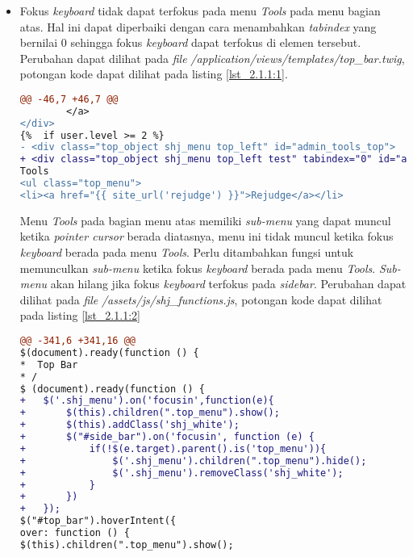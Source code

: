 \begin{itemize}
	\item Fokus \textit{keyboard} tidak dapat terfokus pada menu \textit{Tools} pada menu bagian atas. Hal ini dapat diperbaiki dengan cara menambahkan \textit{tabindex} yang bernilai 0 sehingga fokus \textit{keyboard} dapat terfokus di elemen tersebut. Perubahan dapat dilihat pada \textit{file} \textit{/application/views/templates/top\_bar.twig}, potongan kode dapat dilihat pada listing \ref{lst_2.1.1:1}.
	
\begin{lstlisting}[language=diff, caption=Perubahan pada \textit{file} \textit{top\_bar.twig}, label=lst_2.1.1:1, basicstyle=\ttfamily, frame=single,
columns=fullflexible, keepspaces=true, breaklines=true]
@@ -46,7 +46,7 @@
 		</a>
</div>
{%  if user.level >= 2 %}
- <div class="top_object shj_menu top_left" id="admin_tools_top">
+ <div class="top_object shj_menu top_left test" tabindex="0" id="admin_tools_top">
Tools
<ul class="top_menu">
<li><a href="{{ site_url('rejudge') }}">Rejudge</a></li>
\end{lstlisting}
	
	Menu \textit{Tools} pada bagian menu atas memiliki \textit{sub-menu} yang dapat muncul ketika \textit{pointer cursor} berada diatasnya, menu ini tidak muncul ketika fokus \textit{keyboard} berada pada menu \textit{Tools}. Perlu ditambahkan fungsi untuk memunculkan \textit{sub-menu} ketika fokus \textit{keyboard} berada pada menu \textit{Tools}. \textit{Sub-menu} akan hilang jika fokus \textit{keyboard} terfokus pada \textit{sidebar}. Perubahan dapat dilihat pada \textit{file} \textit{/assets/js/shj\_functions.js}, potongan kode dapat dilihat pada listing \ref{lst_2.1.1:2}
	
\begin{lstlisting}[language=diff, caption=Perubahan pada \textit{file} \textit{shj\_functions.js}, label=lst_2.1.1:2, basicstyle=\ttfamily, frame=single,
columns=fullflexible, keepspaces=true, breaklines=true]
@@ -341,6 +341,16 @@ 
$(document).ready(function () {
*  Top Bar
* /
$ (document).ready(function () {
+ 	$('.shj_menu').on('focusin',function(e){
+ 		$(this).children(".top_menu").show();
+ 		$(this).addClass('shj_white');
+ 		$("#side_bar").on('focusin', function (e) {
+ 			if(!$(e.target).parent().is('top_menu')){
+ 				$('.shj_menu').children(".top_menu").hide();
+ 				$('.shj_menu').removeClass('shj_white');
+ 			}
+ 		})
+ 	});
$("#top_bar").hoverIntent({
over: function () {
$(this).children(".top_menu").show();
\end{lstlisting}


\end{itemize}
